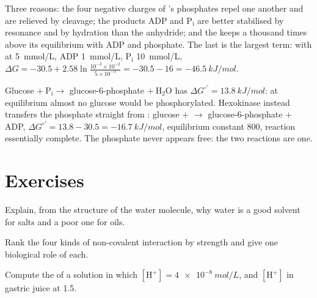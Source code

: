 \begin{example}\label{ex:b1:water-small-molecules:whyatp}
Three reasons: the four negative charges of 's phosphates repel one
another and are relieved by cleavage; the products $\mathrm{ADP}$ and
$\mathrm{P_i}$ are better stabilised by resonance and by hydration than
the anhydride; and the  keeps  a thousand times above its
equilibrium with ADP and phosphate. The last is the largest term:
with  at \qty{5}{mmol/L}, ADP \qty{1}{mmol/L}, $\mathrm{P_i}$
\qty{10}{mmol/L},
$\Delta G = -30.5 + 2.58\ln\frac{10^{-3}\times 10^{-2}}{5\times 10^{-3}}
= -30.5 - 16 = \qty{-46.5}{kJ/mol}$.
\end{example}

\begin{example}[Coupling]\label{ex:b1:water-small-molecules:coupling}
Glucose $+\ \mathrm{P_i} \to$ glucose-6-phosphate $+\ \mathrm{H_2O}$
has $\Delta G^{\circ\prime} = \qty{+13.8}{kJ/mol}$: at equilibrium
almost no glucose would be phosphorylated. Hexokinase instead
transfers the phosphate straight from : glucose $+$  $\to$
glucose-6-phosphate $+$ ADP, $\Delta G^{\circ\prime} = 13.8 - 30.5 =
\qty{-16.7}{kJ/mol}$, equilibrium constant $800$, reaction essentially
complete. The phosphate never appears free: the two reactions are one.
\end{example}

\section{Exercises}

\begin{exercise}[$\star$]\label{exo:b1:water-small-molecules:1}
Explain, from the structure of the water molecule, why water is a good
solvent for salts and a poor one for oils.
\end{exercise}

\begin{exercise}[$\star$]\label{exo:b1:water-small-molecules:2}
Rank the four kinds of non-covalent interaction by strength and give
one biological role of each.
\end{exercise}

\begin{exercise}[$\star$]\label{exo:b1:water-small-molecules:3}
Compute the  of a solution in which $[\mathrm{H^+}] = \qty{4e-8}{mol/L}$,
and $[\mathrm{H^+}]$ in gastric juice at  1.5.
\end{exercise}

